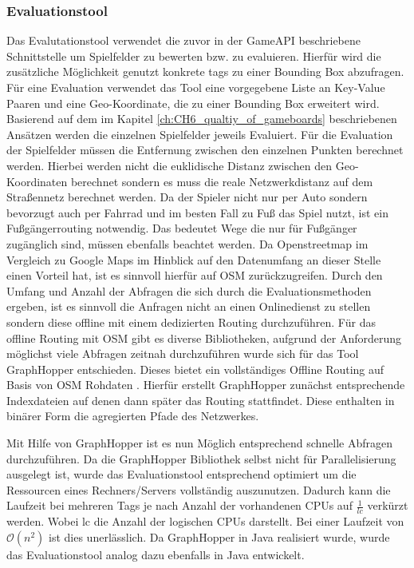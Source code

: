 \subsubsection*{Evaluationstool}

Das Evalutationstool verwendet die zuvor in der GameAPI beschriebene Schnittstelle um Spielfelder zu bewerten bzw. zu evaluieren. Hierfür wird die zusätzliche Möglichkeit genutzt konkrete tags zu einer Bounding Box abzufragen. Für eine Evaluation verwendet das Tool eine vorgegebene Liste an Key-Value Paaren und eine Geo-Koordinate, die zu einer Bounding Box erweitert wird. Basierend auf dem im Kapitel \ref{ch:CH6_qualtiy_of_gameboards} beschriebenen Ansätzen werden die einzelnen Spielfelder jeweils Evaluiert. Für die Evaluation der Spielfelder müssen die Entfernung zwischen den einzelnen Punkten berechnet werden. Hierbei werden nicht die euklidische Distanz zwischen den Geo-Koordinaten berechnet sondern es muss die reale Netzwerkdistanz auf dem Straßennetz berechnet werden. Da der Spieler nicht nur per Auto sondern bevorzugt auch per Fahrrad und im besten Fall zu Fuß das Spiel nutzt, ist ein Fußgängerrouting notwendig. Das bedeutet Wege die nur für Fußgänger zugänglich sind, müssen ebenfalls beachtet werden. Da Openstreetmap im Vergleich zu Google Maps im Hinblick auf den Datenumfang an dieser Stelle einen Vorteil hat, ist es sinnvoll hierfür auf OSM zurückzugreifen. Durch den Umfang und Anzahl der Abfragen die sich durch die Evaluationsmethoden ergeben, ist es sinnvoll die Anfragen nicht an einen Onlinedienst zu stellen sondern diese offline mit einem dedizierten Routing durchzuführen. Für das offline Routing mit OSM gibt es diverse Bibliotheken, aufgrund der Anforderung möglichst viele Abfragen zeitnah durchzuführen wurde sich für das Tool GraphHopper entschieden. Dieses bietet ein vollständiges Offline Routing auf Basis von OSM Rohdaten \cite{Karich.2014}. Hierfür erstellt GraphHopper zunächst entsprechende Indexdateien auf denen dann später das Routing stattfindet. Diese enthalten in binärer Form die agregierten Pfade des Netzwerkes.

Mit Hilfe von GraphHopper ist es nun Möglich entsprechend schnelle Abfragen durchzuführen. Da die GraphHopper Bibliothek selbst nicht für Parallelisierung ausgelegt ist, wurde das Evaluationstool entsprechend optimiert um die Ressourcen eines Rechners/Servers vollständig auszunutzen. Dadurch kann die Laufzeit bei mehreren Tags je nach Anzahl der vorhandenen CPUs auf $\frac{1}{lc}$ verkürzt werden. Wobei lc die Anzahl der logischen CPUs darstellt. Bei einer Laufzeit von $\mathcal O(n^2)$ ist dies unerlässlich.
Da GraphHopper in Java realisiert wurde, wurde das Evaluationstool analog dazu ebenfalls in Java entwickelt.

